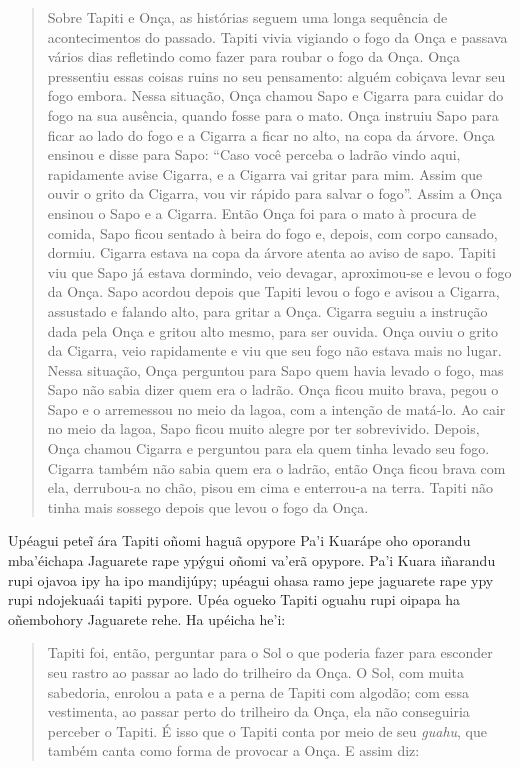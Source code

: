 \begin{quote}
Sobre Tapiti e Onça, as histórias seguem uma longa sequência de
acontecimentos do passado. Tapiti vivia vigiando o fogo da Onça e
passava vários dias refletindo como fazer para roubar o fogo da Onça.
Onça pressentiu essas coisas ruins no seu pensamento: alguém cobiçava
levar seu fogo embora. Nessa situação, Onça chamou Sapo e Cigarra para
cuidar do fogo na sua ausência, quando fosse para o mato. Onça instruiu
Sapo para ficar ao lado do fogo e a Cigarra a ficar no alto, na copa da
árvore. Onça ensinou e disse para Sapo: ``Caso você perceba o ladrão
vindo aqui, rapidamente avise Cigarra, e a Cigarra vai gritar para mim.
Assim que ouvir o grito da Cigarra, vou vir rápido para salvar o fogo''.
Assim a Onça ensinou o Sapo e a Cigarra. Então Onça foi para o mato à
procura de comida, Sapo ficou sentado à beira do fogo e, depois, com
corpo cansado, dormiu. Cigarra estava na copa da árvore atenta ao aviso
de sapo. Tapiti viu que Sapo já estava dormindo, veio devagar,
aproximou-se e levou o fogo da Onça. Sapo acordou depois que Tapiti
levou o fogo e avisou a Cigarra, assustado e falando alto, para gritar a
Onça. Cigarra seguiu a instrução dada pela Onça e gritou alto mesmo,
para ser ouvida. Onça ouviu o grito da Cigarra, veio rapidamente e viu
que seu fogo não estava mais no lugar. Nessa situação, Onça perguntou
para Sapo quem havia levado o fogo, mas Sapo não sabia dizer quem era o
ladrão. Onça ficou muito brava, pegou o Sapo e o arremessou no meio da
lagoa, com a intenção de matá-lo. Ao cair no meio da lagoa, Sapo ficou
muito alegre por ter sobrevivido. Depois, Onça chamou Cigarra e
perguntou para ela quem tinha levado seu fogo. Cigarra também não sabia
quem era o ladrão, então Onça ficou brava com ela, derrubou-a no chão,
pisou em cima e enterrou-a na terra. Tapiti não tinha mais sossego
depois que levou o fogo da Onça.
\end{quote}

Upéagui peteĩ ára Tapiti oñomi haguã opypore Pa'i Kuarápe oho oporandu
mba'éichapa Jaguarete rape ypýgui oñomi va'erã opypore. Pa'i Kuara
iñarandu rupi ojavoa ipy ha ipo mandijúpy; upéagui ohasa ramo jepe
jaguarete rape ypy rupi ndojekuaái tapiti pypore. Upéa ogueko Tapiti
oguahu rupi oipapa ha oñembohory Jaguarete rehe. Ha upéicha he'i:

\begin{quote}
Tapiti foi, então, perguntar para o Sol o que poderia fazer para
esconder seu rastro ao passar ao lado do trilheiro da Onça. O Sol, com
muita sabedoria, enrolou a pata e a perna de Tapiti com algodão; com
essa vestimenta, ao passar perto do trilheiro da Onça, ela não
conseguiria perceber o Tapiti. É isso que o Tapiti conta por meio de seu
\emph{guahu}, que também canta como forma de provocar a Onça. E assim
diz:
\end{quote}

